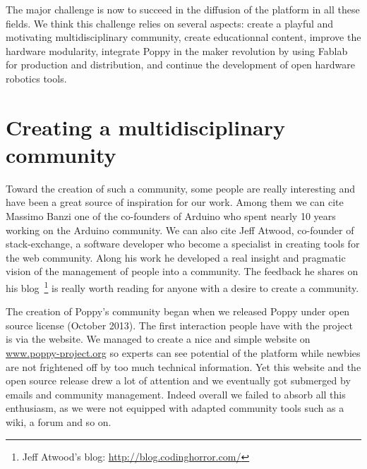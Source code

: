
The major challenge is now to succeed in the diffusion of the platform in all these fields.
We think this challenge relies on several aspects: create a playful and motivating multidisciplinary community, create educationnal content, improve the hardware modularity, integrate Poppy in the maker revolution by using Fablab for production and distribution, and continue the development of open hardware robotics tools.





\section{Creating a multidisciplinary community} %
\label{sec:creating_a_multi}

Toward the creation of such a community, some people are really interesting and have been a great source of inspiration for our work. Among them we can cite Massimo Banzi one of the co-founders of Arduino who spent nearly 10 years working on the Arduino community. We can also cite Jeff Atwood, co-founder of stack-exchange, a software developer who become a specialist in creating tools for the web community. Along his work he developed a real insight and pragmatic vision of the management of people into a community. The feedback he shares on his blog~\footnote{Jeff Atwood's blog: \url{http://blog.codinghorror.com/}} is really worth reading for anyone with a desire to create a community.

The creation of Poppy's community began when we released Poppy under open source license (October 2013).
The first interaction people have with the project is via the website. We managed to create a nice and simple website on \url{www.poppy-project.org} so experts can see potential of the platform while newbies are not frightened off by too much technical information.
Yet this website and the open source release drew a lot of attention and we eventually got submerged by emails and community management. Indeed overall  we failed to absorb all this enthusiasm, as we were not equipped with adapted community tools such as a wiki, a forum and so on.

